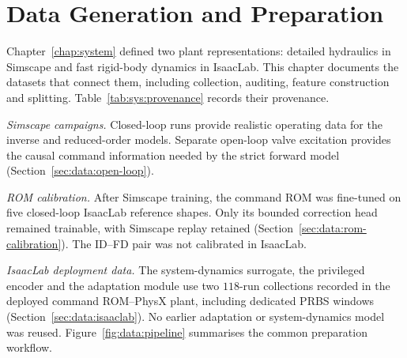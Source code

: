 \chapter{Data Generation and Preparation}
\label{chap:data}

Chapter~\ref{chap:system} defined two plant representations: detailed
hydraulics in Simscape and fast rigid-body dynamics in IsaacLab. This chapter
documents the datasets that connect them, including collection, auditing,
feature construction and splitting. Table~\ref{tab:sys:provenance} records
their provenance.

\emph{Simscape campaigns.} Closed-loop runs provide realistic operating data
for the inverse and reduced-order models. Separate open-loop valve excitation
provides the causal command information needed by the strict forward model
(Section~\ref{sec:data:open-loop}).

\emph{ROM calibration.} After Simscape training, the command ROM was
fine-tuned on five closed-loop IsaacLab reference shapes. Only its bounded
correction head remained trainable, with Simscape replay retained
(Section~\ref{sec:data:rom-calibration}). The ID--FD pair was not calibrated
in IsaacLab.

\emph{IsaacLab deployment data.} The system-dynamics surrogate, the privileged
encoder and the adaptation module use two $118$-run collections recorded in the
deployed command
ROM--PhysX plant, including dedicated PRBS windows
(Section~\ref{sec:data:isaaclab}). No earlier adaptation or system-dynamics
model was reused. Figure~\ref{fig:data:pipeline} summarises the common
preparation workflow.

